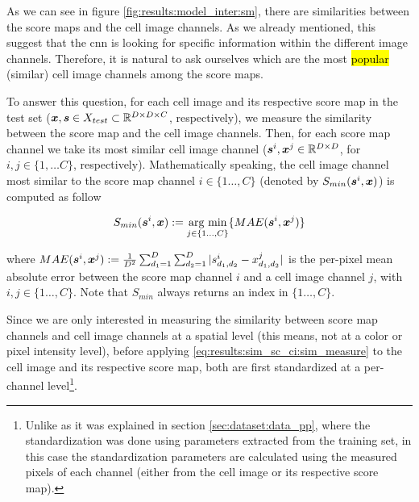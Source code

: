 
\glsresetall
\graphicspath{{./Sections/Results/Resources/}}

As we can see in figure \ref{fig:results:model_inter:sm}, there are similarities between the score maps and the cell image channels. As we already mentioned, this suggest that the \gls{cnn} is looking for specific information within the different image channels. Therefore, it is natural to ask ourselves which are the most \hl{popular} (similar) cell image channels among the score maps.

To answer this question, for each cell image and its respective score map in the test set ($\boldsymbol{x}, \boldsymbol{s} \in X_{test} \subset \mathbb{R}^{D \times D \times C}$, respectively), we measure the similarity between the score map and the cell image channels. Then, for each score map channel we take its most similar cell image channel ($\boldsymbol{s}^i, \boldsymbol{x}^j \in \mathbb{R}^{D \times D}$, for $i,j \in \{1, \dots C\}$, respectively).
Mathematically speaking, the cell image channel most similar to the score map channel $i \in \{1 \dots, C\}$ (denoted by $S_{min}(\boldsymbol{s}^i, \boldsymbol{x})$) is computed as follow

\begin{equation}
  S_{min}(\boldsymbol{s}^i, \boldsymbol{x}) := \underset{j \in \{1 \dots, C\}}{\text{arg min}} \{MAE(\boldsymbol{s}^i, \boldsymbol{x}^j)\}
  \label{eq:results:sim_sc_ci:sim_measure}
\end{equation}

\noindent where $MAE(\boldsymbol{s}^i, \boldsymbol{x}^j):=\frac{1}{D^2} \sum_{d_1=1}^D \sum_{d_2=1}^D |s^i_{d_1, d_2}-x^j_{d_1, d_2}|$ is the per-pixel mean absolute error between the score map channel $i$ and a cell image channel $j$, with $i, j \in \{1 \dots, C\}$.
Note that $S_{min}$ always returns an index in $\{1 \dots, C\}$.

Since we are only interested in measuring the similarity between score map channels and cell image channels at a spatial level (this means, not at a color or pixel intensity level), before applying \ref{eq:results:sim_sc_ci:sim_measure} to the cell image and its respective score map, both are first standardized at a per-channel level\footnote{Unlike as it was explained in section \ref{sec:dataset:data_pp}, where the standardization was done using parameters extracted from the training set, in this case the standardization parameters are calculated using the measured pixels of each channel (either from the cell image or its respective score map).}.

